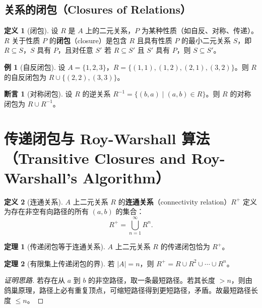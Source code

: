 \documentclass[UTF8,11pt,a4paper]{ctexbook}   %
\theoremstyle{definition}
\newtheorem{definition}{定义}[section]
\newtheorem{theorem}{定理}[section]
\newtheorem{example}{例}[section]
\newtheorem{proposition}{断言}[section]
\begin{document}
\subsection{关系的闭包（Closures of Relations）}

\begin{definition}[闭包]
设 $R$ 是 $A$ 上的二元关系，$P$ 为某种性质（如自反、对称、传递）。$R$ 关于性质 $P$ 的\textbf{闭包}（closure）是包含 $R$ 且具有性质 $P$ 的最小二元关系 $S$，即 $R \subseteq S$，$S$ 具有 $P$，且对任意 $S'$ 若 $R \subseteq S'$ 且 $S'$ 具有 $P$，则 $S \subseteq S'$。
\end{definition}

\begin{example}[自反闭包]
设 $A=\{1,2,3\}$，$R=\{(1,1),(1,2),(2,1),(3,2)\}$。则 $R$ 的自反闭包为 $R \cup \{(2,2),(3,3)\}$。
\end{example}

\begin{proposition}[对称闭包]
设 $R$ 的逆关系 $R^{-1} = \{(b,a) \mid (a,b) \in R\}$。则 $R$ 的对称闭包为 $R \cup R^{-1}$。
\end{proposition}

\section{传递闭包与 Roy-Warshall 算法（Transitive Closures and Roy-Warshall's Algorithm）}

\begin{definition}[连通关系]
$A$ 上二元关系 $R$ 的\textbf{连通关系}（connectivity relation）$R^+$ 定义为存在非空有向路径的所有 $(a,b)$ 的集合：
\[
R^+ = \bigcup_{n=1}^{\infty} R^n.
\]
\end{definition}

\begin{theorem}[传递闭包等于连通关系]
$A$ 上二元关系 $R$ 的传递闭包恰为 $R^+$。
\end{theorem}

\begin{theorem}[有限集上传递闭包的界]
若 $|A|=n$，则 $R^+ = R \cup R^2 \cup \cdots \cup R^n$。
\end{theorem}

\begin{proof}[证明思路]
若存在从 $a$ 到 $b$ 的非空路径，取一条最短路径。若其长度 $>n$，则由鸽巢原理，路径上必有重复顶点，可缩短路径得到更短路径，矛盾。故最短路径长度 $\leq n$。
\end{proof}
\end{document}

